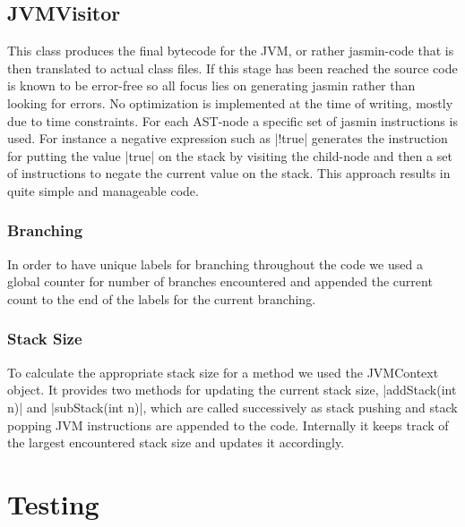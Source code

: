 \documentclass[paper=a4, fontsize=11pt]{scrartcl} %
\numberwithin{equation}{section} %
\numberwithin{figure}{section} %
\numberwithin{table}{section} %
\begin{document}
\subsection{JVMVisitor}

This class produces the final bytecode for the JVM, or rather jasmin-code that is then translated to actual class files.
If this stage has been reached the source code is known to be error-free so all focus lies on generating jasmin rather than looking for errors.
No optimization is implemented at the time of writing, mostly due to time constraints.
For each AST-node a specific set of jasmin instructions is used.
For instance a negative expression such as |!true| generates the instruction for putting the value |true| on the stack by visiting the child-node and then a set of instructions to negate the current value on the stack.
This approach results in quite simple and manageable code.

\subsubsection*{Branching}

In order to have unique labels for branching throughout the code we used a global counter for number of branches encountered and appended the current count to the end of the labels for the current branching.

\subsubsection*{Stack Size}

To calculate the appropriate stack size for a method we used the JVMContext object.
It provides two methods for updating the current stack size, |addStack(int n)| and |subStack(int n)|, which are called successively as stack pushing and stack popping JVM instructions are appended to the code.
Internally it keeps track of the largest encountered stack size and updates it accordingly.\\

\section{Testing}
\end{document}
